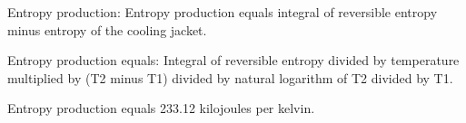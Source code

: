 Entropy production:  
Entropy production equals integral of reversible entropy minus entropy of the cooling jacket.  

Entropy production equals:  
Integral of reversible entropy divided by temperature multiplied by (T2 minus T1) divided by natural logarithm of T2 divided by T1.  

Entropy production equals 233.12 kilojoules per kelvin.